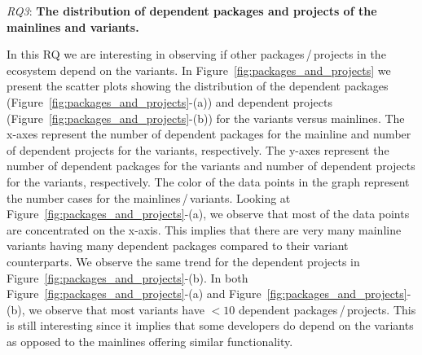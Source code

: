 \textit{RQ3}: \textbf{The distribution of dependent packages and projects of the mainlines and variants.}

In this RQ we are interesting in observing if other packages\,/\,projects in the ecosystem depend on the variants.
In Figure~\ref{fig:packages_and_projects} we present the scatter plots showing the distribution of the dependent packages (Figure~\ref{fig:packages_and_projects}-(a)) and dependent projects (Figure~\ref{fig:packages_and_projects}-(b)) for the variants versus mainlines.
The x-axes represent the number of dependent packages for the mainline and number of dependent projects for the variants, respectively.
The y-axes represent the number of dependent packages for the variants and number of dependent projects for the variants, respectively.
The color of the data points in the graph represent the number cases for the mainlines\,/\,variants.
Looking at Figure~\ref{fig:packages_and_projects}-(a), we observe that most of the data points are concentrated on the x-axis. 
This implies that there are very many mainline variants having many dependent packages compared to their variant counterparts.
We observe the same trend for the dependent projects in Figure~\ref{fig:packages_and_projects}-(b).
In both Figure~\ref{fig:packages_and_projects}-(a) and Figure~\ref{fig:packages_and_projects}-(b), we observe that most variants have $<10$ dependent packages\,/\,projects. 
This is still interesting since it implies that some developers do depend on the variants as opposed to the mainlines offering similar functionality.
